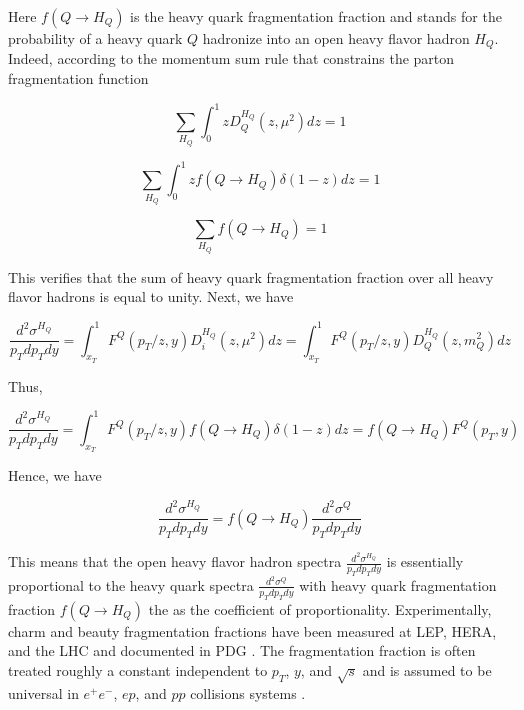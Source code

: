Here $f({Q \rightarrow H_Q})$ is the heavy quark fragmentation fraction and stands for the probability of a heavy quark $Q$ hadronize into an open heavy flavor hadron $H_Q$. Indeed, according to the momentum sum rule that constrains the parton fragmentation function \cite{QCDFFunc}

\begin{equation}
\sum_{H_Q} \int_0^1 z D^{H_Q}_{Q}(z,\mu^2) dz = 1
\end{equation}

\begin{equation}
\sum_{H_Q} \int_0^1 z f(Q \rightarrow H_Q) \delta(1 - z) dz = 1
\end{equation}

\begin{equation}
\sum_{H_Q} f(Q \rightarrow H_Q) = 1 
\end{equation}

This verifies that the sum of heavy quark fragmentation fraction over all heavy flavor hadrons is equal to unity. Next, we have 


\begin{equation}
\frac{d^2\sigma^{H_Q}}{p_T dp_T dy} = \int_{x_T}^1 F^Q(p_T/z, y) D_{i}^{H_Q}(z,\mu^2) dz =  \int_{x_T}^1 F^Q(p_T/z, y) D^{H_Q}_{Q}(z,m_Q^2) dz 
\end{equation}

Thus,

\begin{equation}
\frac{d^2\sigma^{H_Q}}{p_T dp_T dy}  = \int_{x_T}^1 F^Q(p_T/z, y) f(Q \rightarrow H_Q) \delta(1 - z) dz =  f(Q \rightarrow H_Q)  F^Q(p_T, y)
\end{equation}

Hence, we have 

\begin{equation}
\frac{d^2\sigma^{H_Q}}{p_T dp_T dy} = f(Q \rightarrow H_Q) \frac{d^2\sigma^{Q}}{p_T dp_T dy}
\end{equation}

This means that the open heavy flavor hadron spectra $\frac{d^2\sigma^{H_Q}}{p_T dp_T dy}$ is essentially proportional to the heavy quark spectra $\frac{d^2\sigma^{Q}}{p_T dp_T dy}$ with heavy quark fragmentation fraction $f(Q \rightarrow H_Q)$ the as the coefficient of proportionality. Experimentally, charm and beauty fragmentation fractions have been measured at LEP, HERA, and the LHC and documented in PDG \cite{AlphaTheoEx}. The fragmentation fraction is often treated roughly a constant independent to $p_T$, $y$, and $\sqrt s$ and is assumed to be universal in $e^+e^-$, $ep$, and $pp$ collisions systems \cite{AlphaTheoEx}. 

